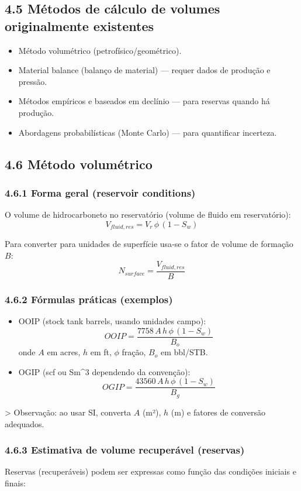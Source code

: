 \documentclass[11pt,a4paper]{article}
\begin{document}
\subsection{4.5 Métodos de cálculo de volumes originalmente existentes}
\begin{itemize}
\item Método volumétrico (petrofísico/geométrico).
\item Material balance (balanço de material) — requer dados de produção e pressão.
\item Métodos empíricos e baseados em declínio — para reservas quando há produção.
\item Abordagens probabilísticas (Monte Carlo) — para quantificar incerteza.
\end{itemize}

\subsection{4.6 Método volumétrico}
\subsubsection{4.6.1 Forma geral (reservoir conditions)}
O volume de hidrocarboneto no reservatório (volume de fluido em reservatório):
$$
V_{fluid,res} = V_r\,\phi\,(1-S_w)
$$

Para converter para unidades de superfície usa‑se o fator de volume de formação $B$:
$$
N_{surface} = \frac{V_{fluid,res}}{B}
$$

\subsubsection{4.6.2 Fórmulas práticas (exemplos)}
\begin{itemize}
\item OOIP (stock tank barrels, usando unidades campo):
$$
OOIP = \frac{7758\,A\,h\,\phi\,(1-S_w)}{B_o}
$$
onde $A$ em acres, $h$ em ft, $\phi$ fração, $B_o$ em bbl/STB.
\end{itemize}

\begin{itemize}
\item OGIP (scf ou Sm^3 dependendo da convenção):
$$
OGIP = \frac{43560\,A\,h\,\phi\,(1-S_w)}{B_g}
$$
\end{itemize}

> Observação: ao usar SI, converta $A$ (m²), $h$ (m) e fatores de conversão adequados.

\subsubsection{4.6.3 Estimativa de volume recuperável (reservas)}
Reservas (recuperáveis) podem ser expressas como função das condições iniciais e finais:
\end{document}
